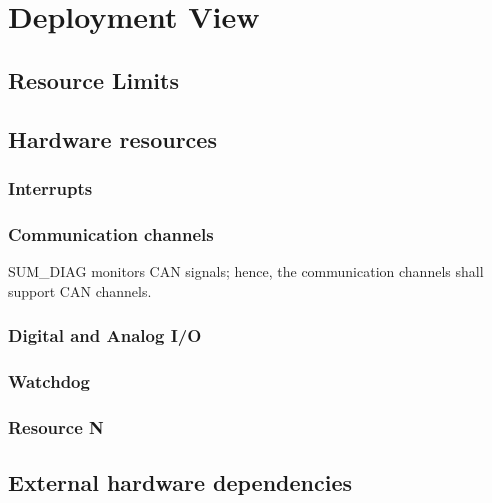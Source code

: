 \chapter{Deployment View}

\section{Resource Limits}

\section{Hardware resources}

\subsection{Interrupts}

\subsection{Communication channels}

SUM_DIAG monitors CAN signals; hence, the communication channels shall support CAN channels.

\subsection{Digital and Analog I/O}

\subsection{Watchdog}

\subsection{Resource N}

\section{External hardware dependencies}
